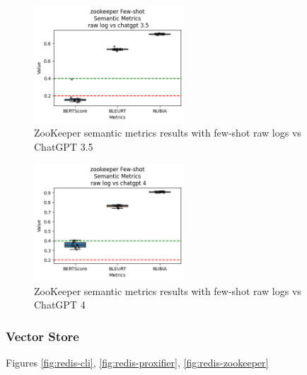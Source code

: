 \documentclass[conference]{IEEEtran}
\begin{document}
\begin{figure}[h!]
    \centering
    \includegraphics[width=0.5\textwidth]{milestone4/img/zookeeper-few-shot-semantic-raw-35.png}
    \caption{ZooKeeper semantic metrics results with few-shot raw logs vs ChatGPT 3.5}
    \label{fig:zookeeper-fewshot-semantic-raw-gpt35}
\end{figure}

\begin{figure}[ht]
    \centering
    \includegraphics[width=0.5\textwidth]{milestone4/img/zookeeper-few-shot-semantic-raw-4.png}
    \caption{ZooKeeper semantic metrics results with few-shot raw logs vs ChatGPT 4}
    \label{fig:zookeeper-fewshot-semantic-raw-gpt4}
\end{figure}

\subsubsection{Vector Store}

Figures \ref{fig:redis-cli}, \ref{fig:redis-proxifier}, \ref{fig:redis-zookeeper}
\end{document}
